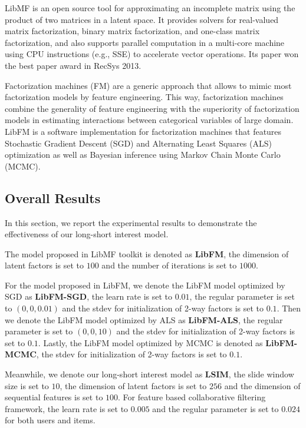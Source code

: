 \documentclass{llncs}
\begin{document}
LibMF is an open source tool for approximating an incomplete matrix
using the product of two matrices in a latent space.
It provides solvers for real-valued matrix factorization,
binary matrix factorization, and one-class matrix factorization, and 
also supports parallel computation in a multi-core machine using CPU
instructions (e.g., SSE) to accelerate vector operations.
Its paper \cite{chin2015fast} won the best paper award in RecSys 2013.

Factorization machines (FM) are a generic approach that
allows to mimic most factorization models by feature engineering.
This way, factorization machines combine the generality of
feature engineering with the superiority of factorization models
in estimating interactions between categorical variables of large domain.
LibFM \cite{rendle2012factorization} is a software implementation
for factorization machines that features
Stochastic Gradient Descent (SGD) and
Alternating Least Squares (ALS) optimization as well as
Bayesian inference using Markov Chain Monte Carlo (MCMC).

\subsection{Overall Results}
In this section, we report the experimental results to demonstrate
the effectiveness of our long-short interest model.

The model proposed in LibMF toolkit is denoted as \textbf{LibFM},
the dimension of latent factors is set to $100$ and the number of
iterations is set to $1000$.

For the model proposed in LibFM, we denote the LibFM model optimized by
SGD as \textbf{LibFM-SGD}, the learn rate is set to $0.01$, the regular
parameter is set to $(0,0,0.01)$ and the stdev for initialization of 2-way
factors is set to $0.1$. Then we denote the LibFM model optimized by ALS
as \textbf{LibFM-ALS}, the regular parameter is set to $(0,0,10)$ and the
stdev for initialization of 2-way factors is set to $0.1$. Lastly, the
LibFM model optimized by MCMC is denoted as \textbf{LibFM-MCMC}, the stdev
for initialization of 2-way factors is set to $0.1$.

Meanwhile, we denote our long-short interest model as \textbf{LSIM},
the slide window size is set to $10$, the dimension of latent factors is
set to $256$ and the dimension of sequential features is set to $100$.
For feature based collaborative filtering framework, the learn rate is set
to $0.005$ and the regular parameter is set to $0.024$ for both users and items.
\end{document}
